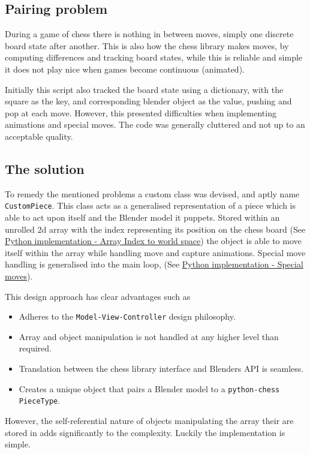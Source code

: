 \documentclass[11pt]{article}
\begin{document}
\subsection{Pairing problem}
\label{sec:org76aed27}
During a game of chess there is nothing in between moves, simply one discrete
board state after another. This is also how the chess library makes moves, by
computing differences and tracking board states, while this is reliable and
simple it does not play nice when games become continuous (animated).

Initially this script also tracked the board state using a dictionary, with the
square as the key, and corresponding blender object as the value, pushing and
pop at each move. However, this presented difficulties when implementing
animations and special moves. The code was generally cluttered
and not up to an acceptable quality.
\subsection{The solution}
\label{sec:org1e445c8}
To remedy the mentioned problems a custom class was devised, and aptly name
\texttt{CustomPiece}. This class acts as a generalised representation of a piece which
is able to act upon itself and the Blender model it puppets. Stored within an
unrolled 2d array with the index representing its position on the chess board
(See \hyperref[sec:org3045217]{Python implementation - Array Index to world space}) the object is able to
move itself within the array while handling move and capture animations. Special
move handling is generalised into the main loop, (See \hyperref[sec:org274f0d1]{Python implementation -
Special moves}).

This design approach has clear advantages such as
\begin{itemize}
\item Adheres to the \texttt{Model-View-Controller} design philosophy.
\item Array and object manipulation is not handled at any higher level than required.
\item Translation between the chess library interface and Blenders API is seamless.
\item Creates a unique object that pairs a Blender model to a \texttt{python-chess}
\texttt{PieceType}.
\end{itemize}
However, the self-referential nature of objects manipulating the array their
are stored in adds significantly to the complexity. Luckily the implementation is
simple.
\end{document}
